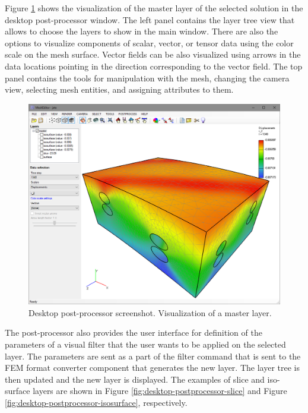 Figure \ref{fig:desktop-postprocessor-master} shows the visualization of the master layer of the selected solution in the desktop post-processor window. The left panel contains the layer tree view that allows to choose the layers to show in the main window. There are also the options to visualize components of scalar, vector, or tensor data using the color scale on the mesh surface. Vector fields can be also visualized using arrows in the data locations pointing in the direction corresponding to the vector field. The top panel contains the tools for manipulation with the mesh, changing the camera view, selecting mesh entities, and assigning attributes to them.

\begin{figure}[H]
    \centering
    \includegraphics[width=\textwidth]{figures/chapter-data-management/desktop-postprocessor-master}
    \decoRule
    \caption{Desktop post-processor screenshot. Visualization of a master layer.}
    \label{fig:desktop-postprocessor-master}
\end{figure}

The post-processor also provides the user interface for definition of the parameters of a visual filter that the user wants to be applied on the selected layer. The parameters are sent as a part of the filter command that is sent to the FEM format converter component that generates the new layer. The layer tree is then updated and the new layer is displayed. The examples of slice and iso-surface layers are shown in Figure \ref{fig:desktop-postprocessor-slice} and Figure \ref{fig:desktop-postprocessor-isosurface}, respectively.


